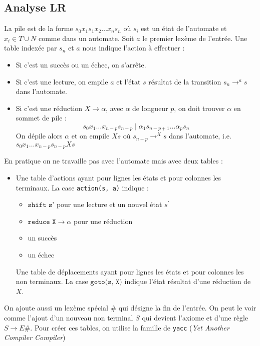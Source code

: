 \documentclass{cours}
\begin{document}
\subsection{Analyse LR}
La pile est de la forme $s_{0}x_{1}s_{1}x_{2}\ldots x_{n}s_{n}$ où $s_{i}$ est un état de l'automate et $x_{i} \in T \cup N$ comme dans un automate.
Soit $a$ le premier lexème de l'entrée. Une table indexée par $s_{n}$ et $a$ nous indique l'action à effectuer :
\begin{itemize}
    \item Si c'est un succès ou un échec, on s'arrête.
    \item Si c'est une lecture, on empile $a$ et l'état $s$ résultat de la transition $s_{n} \rightarrow^{a} s$ dans l'automate.
    \item Si c'est une réduction $X \rightarrow \alpha$, avec $\alpha$ de longueur $p$, on doit trouver $\alpha$ en sommet de pile :
          \[
              s_{0}x_{1}\ldots x_{n-p}s_{n-p}\mid \alpha_{1}s_{n-p+1}\ldots \alpha_{p}s_{n}
          \]
          On dépile alors $\alpha$ et on empile $X s$ où $s_{n-p} \rightarrow^{X} s$ dans l'automate, i.e. $s_{0}x_{1}\ldots x_{n-p}s_{n-p}Xs$
\end{itemize}

En pratique on ne travaille pas avec l'automate mais avec deux tables :
\begin{itemize}
    \item Une table d'actions ayant pour lignes les états et pour colonnes les terminaux. La case \texttt{action(s, a)} indique :
          \begin{itemize}
              \item $\texttt{shift s'}$ pour une lecture et un nouvel état $s^{'}$
              \item $\texttt{reduce X} \rightarrow \alpha$ pour une réduction
              \item un succès
              \item un échec
          \end{itemize}
          Une table de déplacements ayant pour lignes les états et pour colonnes les non terminaux. La case $\texttt{goto(s, X)}$ indique l'état résultat d'une réduction de $X$.
\end{itemize}
On ajoute aussi un lexème spécial \# qui désigne la fin de l'entrée. On peut le voir comme l'ajout d'un nouveau non terminal $S$ qui devient l'axiome et d'une règle $S \rightarrow E \#$.
Pour créer ces tables, on utilise la famille de \texttt{yacc} (\textit{Yet Another Compiler Compiler})
\end{document}
